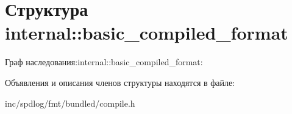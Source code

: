 \hypertarget{structinternal_1_1basic__compiled__format}{}\section{Структура internal\+:\+:basic\+\_\+compiled\+\_\+format}
\label{structinternal_1_1basic__compiled__format}


Граф наследования\+:internal\+:\+:basic\+\_\+compiled\+\_\+format\+:


Объявления и описания членов структуры находятся в файле\+:\begin{DoxyCompactItemize}
\item 
inc/spdlog/fmt/bundled/compile.\+h\end{DoxyCompactItemize}

